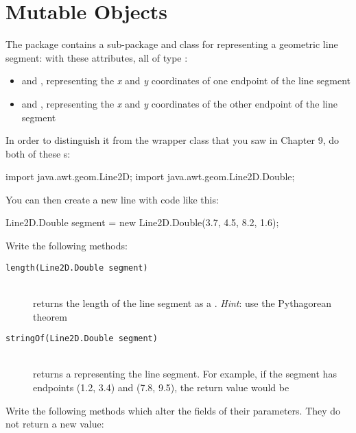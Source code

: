 \chapter{Mutable Objects}

\begin{exercise}
The  package contains a sub-package and class for representing a geometric line segment:  with these attributes, all of type :

\begin{itemize}
\item {} and , representing the {\em x} and {\em y} coordinates of one endpoint of the line segment
\item {} and , representing the {\em x} and {\em y} coordinates of the other endpoint of the line segment
\end{itemize}

In order to distinguish it from the  wrapper class that you saw in Chapter 9, do both of these s:

\begin{code}
import java.awt.geom.Line2D;
import java.awt.geom.Line2D.Double;
\end{code}

You can then create a new line with code like this:

\begin{code}
Line2D.Double segment = new Line2D.Double(3.7, 4.5, 8.2, 1.6);
\end{code}

Write the following methods:

\begin{description}
\item[\texttt{length(Line2D.Double segment)}] \hfill \\ returns the length of the line segment as a . {\em Hint}: use the Pythagorean theorem
\item[\texttt{stringOf(Line2D.Double segment)}] \hfill \\ returns a  representing the line segment. For example, if the segment has endpoints (1.2, 3.4) and (7.8, 9.5), the return value would be 

\end{description}

Write the following  methods which alter the fields of their parameters. They do not return a new value: 


\end{exercise}
